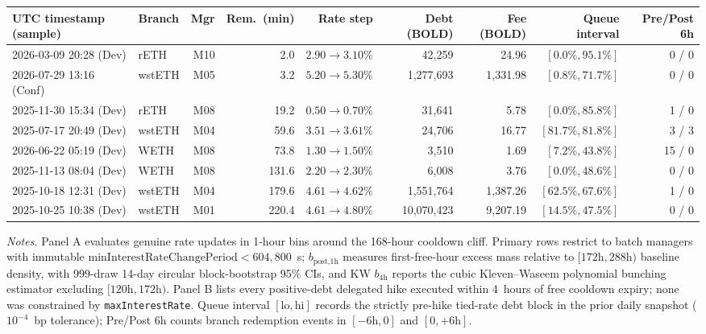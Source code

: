 \begin{table}[!htbp]
{\begin{tabular}{@{}llrrrrrrr@{}}
\midrule
UTC timestamp (sample) & Branch & Mgr & Rem.\ (min) & Rate step & Debt (BOLD) & Fee (BOLD) & Queue interval & Pre/Post 6h \\
\midrule
2026-03-09 20:28 (Dev) & rETH & M10 & 2.0 & $2.90\to 3.10\%$ & 42,259 & 24.96 & $[0.0\%, 95.1\%]$ & 0 / 0 \\
2026-07-29 13:16 (Conf) & wstETH & M05 & 3.2 & $5.20\to 5.30\%$ & 1,277,693 & 1,331.98 & $[0.8\%, 71.7\%]$ & 0 / 0 \\
2025-11-30 15:34 (Dev) & rETH & M08 & 19.2 & $0.50\to 0.70\%$ & 31,641 & 5.78 & $[0.0\%, 85.8\%]$ & 1 / 0 \\
2025-07-17 20:49 (Dev) & wstETH & M04 & 59.6 & $3.51\to 3.61\%$ & 24,706 & 16.77 & $[81.7\%, 81.8\%]$ & 3 / 3 \\
2026-06-22 05:19 (Dev) & WETH & M08 & 73.8 & $1.30\to 1.50\%$ & 3,510 & 1.69 & $[7.2\%, 43.8\%]$ & 15 / 0 \\
2025-11-13 08:04 (Dev) & WETH & M08 & 131.6 & $2.20\to 2.30\%$ & 6,008 & 3.76 & $[0.0\%, 48.6\%]$ & 0 / 0 \\
2025-10-18 12:31 (Dev) & wstETH & M04 & 179.6 & $4.61\to 4.62\%$ & 1,551,764 & 1,387.26 & $[62.5\%, 67.6\%]$ & 1 / 0 \\
2025-10-25 10:38 (Dev) & wstETH & M01 & 220.4 & $4.61\to 4.80\%$ & 10,070,423 & 9,207.19 & $[14.5\%, 47.5\%]$ & 0 / 0 \\
\bottomrule
\end{tabular}}
\par\vspace{4pt}\begin{minipage}{\textwidth}\footnotesize\setlength{\parskip}{0pt}\textit{Notes.} Panel A evaluates genuine rate updates in 1-hour bins around the 168-hour cooldown cliff. Primary rows restrict to batch managers with immutable $\text{minInterestRateChangePeriod} < 604{,}800$~s; $b_{\text{post,1h}}$ measures first-free-hour excess mass relative to $[172\text{h}, 288\text{h})$ baseline density, with 999-draw 14-day circular block-bootstrap 95\% CIs, and KW $b_{4\text{h}}$ reports the cubic Kleven--Waseem polynomial bunching estimator excluding $[120\text{h}, 172\text{h})$. Panel B lists every positive-debt delegated hike executed within 4~hours of free cooldown expiry; none was constrained by \texttt{maxInterestRate}. Queue interval $[\text{lo}, \text{hi}]$ records the strictly pre-hike tied-rate debt block in the prior daily snapshot ($10^{-4}$~bp tolerance); Pre/Post 6h counts branch redemption events in $[-6\text{h}, 0]$ and $[0, +6\text{h}]$.
\end{minipage}
\end{table}

